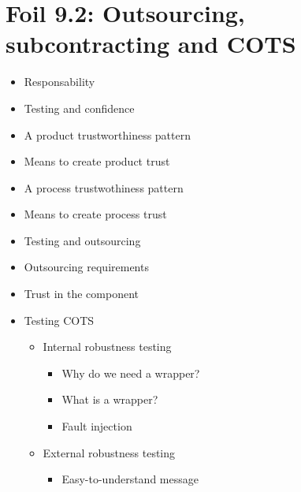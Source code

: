 	\section{Foil 9.2: Outsourcing, subcontracting and COTS}
		\begin{itemize}
			\item Responsability
			\item Testing and confidence
			\item A product trustworthiness pattern
			\item Means to create product trust
			\item A process trustwothiness pattern
			\item Means to create process trust
			\item Testing and outsourcing
			\item Outsourcing requirements
			\item Trust in the component
			\item Testing COTS
				\begin{itemize}
					\item Internal robustness testing
						\begin{itemize}
							\item Why do we need a wrapper?
							\item What is a wrapper?
							\item Fault injection
						\end{itemize}
					\item External robustness testing
						\begin{itemize}
							\item Easy-to-understand message
						\end{itemize}
				\end{itemize}
		\end{itemize}



